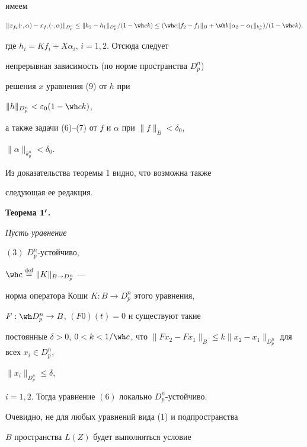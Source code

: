 \begin{pf}
имеем


$$


\|x_{f_2}(\cdot,\alpha ) - x_{f_1}(\cdot,\alpha )\|_{D_p^n} \le


\|h_2 - h_1\|_{D_p^n}/(1- \wh ck) \le


(\wh c\|f_2 - f_1\|_B + \wh b\|\alpha _2 -


\alpha _1\|_{k_p^n})/(1 - \wh ck),


$$


где $h_i = Kf_i + X\alpha _i$, $i = 1,2$. Отсюда следует


непрерывная зависимость (по норме пространства $D_p^n$)


решения $x$ уравнения (9) от $h$ при


$\|h\|_{D_p^n} < \varepsilon _0(1- \wh ck)$,


а также задачи (6)--(7) от $f$ и $\alpha $ при $\|f\|_B < \delta _0$,


$\|\alpha \|_{k_p^n} < \delta _0$.


\end{pf}





Из доказательства теоремы 1 видно, что возможна также


следующая ее редакция.


\medskip





{\bf Теорема $\bold 1^{\boldsymbol\prime}$.} {\it Пусть уравнение


$(3)$ $D_p^n$-устойчиво,


$\wh c\Def \|K\|_{B\to D_p^n}$ ---


норма оператора Коши $K:{B \to D_p^n}$ этого уравнения,


$F:\wh D_p^n \to B$, $(F0)(t) = 0$ и существуют такие


постоянные $\delta > 0$, $0 < k < 1/\wh c$, что $\|Fx_2 - Fx_1\|_B \le


k \|x_2 - x_1\|_{D_p^n}$ для всех $x_i \in D_p^n$,


$\|x_i\|_{D_p^n} \le \delta$,


$i = 1,2$. Тогда уравнение $(6)$ локально $D_p^n$-устойчиво.}


\medskip





Очевидно, не для любых уравнений вида (1) и подпространства


$B$ пространства $L(Z)$ будет выполняться условие


